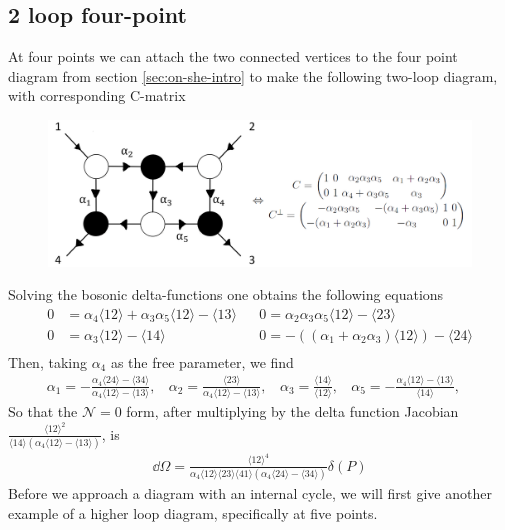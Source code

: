 \documentclass[letter,11pt]{article}
\newcommand{\ab}[1]{\langle #1 \rangle}
\begin{document}
\subsection{2 loop four-point}
At four points we can attach the two connected vertices to the four point diagram from section \ref{sec:on-she-intro} to make the following two-loop diagram, with corresponding C-matrix
\begin{figure}[H]
	\centering
	\includegraphics[width=0.7\linewidth]{two-loop}
	\caption{}
	\label{fig:two-loop}
\end{figure}
Solving the bosonic delta-functions one obtains the following equations
\begin{equation}
	\begin{aligned}
		0&=\alpha_{4} \langle 1 2 \rangle + \alpha_{3} \alpha_{5} \langle 1 2 \rangle - \langle 1 3 \rangle
		&&0=\alpha_{2} \alpha_{3} \alpha_{5} \langle 1 2 \rangle - \langle 2 3 \rangle
		\\
		0&=\alpha_{3} \langle 1 2 \rangle - \langle 1 4 \rangle
		&&0=-((\alpha_{1} + \alpha_{2} \alpha_{3}) \langle 1 2 \rangle) - \langle 2 4 \rangle
		\\
	\end{aligned}
\end{equation}
Then, taking $\alpha_4$ as the free parameter, we find
\begin{equation}
	\begin{aligned}
		\alpha_1=-\frac{\alpha_4\ab{24}-\ab{34}}{\alpha_4\ab{12}-\ab{13}},~~~~\alpha_2=\frac{\ab{23}}{\alpha_4\ab{12}-\ab{13}},~~~~\alpha_3=\frac{\ab{14}}{\ab{12}},~~~~\alpha_5=-\frac{\alpha_4\ab{12}-\ab{13}}{\ab{14}},~~~~
	\end{aligned}
\end{equation}
So that the $\mathcal{N}=0$ form, after multiplying by the delta function Jacobian $\frac{\ab{12}^2}{\ab{14}\left(\alpha_4\ab{12}-\ab{13}\right)}$, is
\begin{equation}
	\begin{aligned}
	\dd\Omega = \frac{\ab{12}^4}{\alpha_4\ab{12}\ab{23}\ab{41}\left(\alpha_4\ab{24}-\ab{34}\right)}\delta(P)	\end{aligned}
\end{equation}
Before we approach a diagram with an internal cycle, we will first give another example of a higher loop diagram, specifically at five points.
\end{document}
